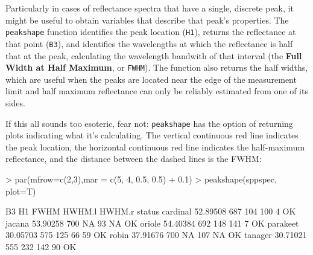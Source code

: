\documentclass{article}
\newcommand{\code}[1]{{\tt #1}}  %
\begin{document}
Particularly in cases of reflectance spectra that have a single, discrete peak, it might be 
useful to obtain variables that describe that peak's properties. The \code{peakshape} function 
identifies the peak location (\code{H1}),  returns the reflectance at that point (\code{B3}), 
and identifies the wavelengths at which the reflectance is half that at the peak, calculating 
the wavelength bandwith of that interval (the \textbf{Full Width at Half Maximum}, or \code{FWHM}). 
The function also returns the half widths, which are useful when the peaks are located near the 
edge of the measurement limit and half maximum reflectance can only be reliably estimated from 
one of its sides.

If this all sounds too esoteric, fear not: \code{peakshape} has the option of returning plots 
indicating what it's calculating. The vertical continuous red line indicates the peak location, 
the horizontal continuous red line indicates the half-maximum reflectance, and the distance 
between the dashed lines is the FWHM:

\begin{Schunk}
\begin{Sinput}
> par(mfrow=c(2,3),mar = c(5, 4, 0.5, 0.5) + 0.1)
> peakshape(sppspec, plot=T)
\end{Sinput}
\begin{Soutput}
               B3  H1 FWHM HWHM.l HWHM.r status
cardinal 52.89508 687  104    100      4     OK
jacana   53.90258 700   NA     93     NA     OK
oriole   54.40384 692  148    141      7     OK
parakeet 30.05703 575  125     66     59     OK
robin    37.91676 700   NA    107     NA     OK
tanager  30.71021 555  232    142     90     OK
\end{Soutput}
\end{Schunk}
\end{document}
